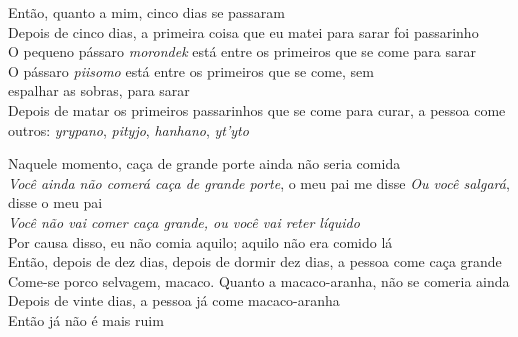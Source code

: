 \noindent Então, quanto a mim, cinco dias se passaram\\
 Depois de cinco dias, a primeira coisa que eu matei para sarar foi passarinho\\
 O pequeno pássaro \textit{morondek} está entre os primeiros que se come para sarar\\
 O pássaro \textit{piisomo} está entre os primeiros que se come, sem\\
 espalhar as sobras, para sarar\\
 Depois de matar os primeiros passarinhos que se come para curar, a
 pessoa come outros: \textit{yrypano}, \textit{pityjo}, \textit{hanhano},
 \textit{yt'yto}
 
 \smallskip
 \begin{center}\end{center}
 \smallskip
 
\noindent Naquele momento, caça de grande porte ainda não seria comida\\
 \textit{Você ainda não comerá caça de grande porte}, o meu pai me disse \textit{Ou você salgará}, disse o meu pai\\
 \textit{Você não vai comer caça grande, ou você vai reter líquido}\\
 Por causa disso, eu não comia aquilo; aquilo não era comido lá\\
 Então, depois de dez dias, depois de dormir dez dias, a pessoa come caça grande\\
 Come-se porco selvagem, macaco. Quanto a macaco-aranha, não se comeria ainda\\
 Depois de vinte dias, a pessoa já come macaco-aranha\\
 Então já não é mais ruim
 

